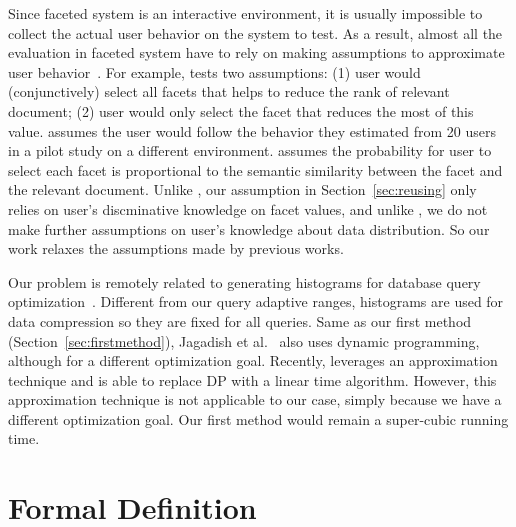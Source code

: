 Since faceted system is an interactive environment, it is usually impossible to collect the actual user behavior on the system to test. As a result, almost all the evaluation in faceted system have to rely on making assumptions to approximate user behavior~\cite{Roy08,Liberman:2012:AOF:2245276.2245409,kashyap10}. For example, \cite{Liberman:2012:AOF:2245276.2245409} tests two assumptions: (1) user would (conjunctively) select all facets that helps to reduce the rank of relevant document; (2) user would only select the facet that reduces the most of this value. \cite{Roy08} assumes the user would follow the behavior they estimated from 20 users in a pilot study on a different environment. \cite{conf/sigir/ZhangZ15} assumes the probability for user to select each facet is proportional to the semantic similarity between the facet and the relevant document. Unlike \cite{conf/sigir/ZhangZ15}, our assumption in Section~\ref{sec:reusing} only relies on user's discminative knowledge on facet values, and unlike \cite{Liberman:2012:AOF:2245276.2245409}, we do not make further assumptions on user's knowledge about data distribution. So our work relaxes the assumptions made by previous works. 

Our problem is remotely related to generating histograms for database query optimization~\cite{conf/vldb/JagadishKMPSS98,conf/pods/AcharyaDHLS15,conf/sigmod/MuralikrishnaD88}. Different from our query adaptive ranges, histograms are used for data compression so they are fixed for all queries. Same as our first method (Section~\ref{sec:firstmethod}), Jagadish et al.~\cite{conf/vldb/JagadishKMPSS98} also uses dynamic programming, although for a different optimization goal. Recently, \cite{conf/pods/AcharyaDHLS15} leverages an approximation technique and is able to replace DP with a linear time algorithm. However, this approximation technique is not applicable to our case, simply because we have a different optimization goal. Our first method would remain a super-cubic running time.

\vspace{-0.13in}



\section{Formal Definition}
\label{sec:problem}

